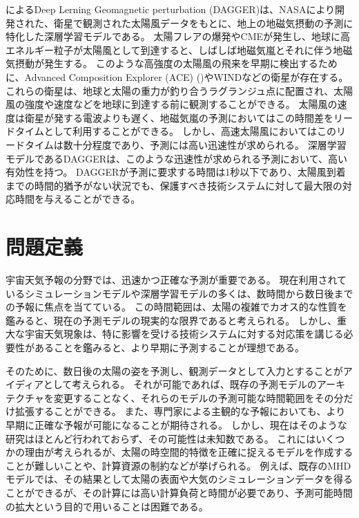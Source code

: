     によるDeep Lerning Geomagnetic perturbation (DAGGER)は、NASAにより開発された、衛星で観測された太陽風データをもとに、地上の地磁気摂動の予測に特化した深層学習モデルである。
    太陽フレアの爆発やCMEが発生し、地球に高エネルギー粒子が太陽風として到達すると、しばしば地磁気嵐とそれに伴う地磁気摂動が発生する。
    このような高強度の太陽風の飛来を早期に検出するために、Advanced Composition Explorer (ACE) ()やWINDなどの衛星が存在する。
    これらの衛星は、地球と太陽の重力が釣り合うラグランジュ点に配置され、太陽風の強度や速度などを地球に到達する前に観測することができる。
    太陽風の速度は衛星が発する電波よりも遅く、地磁気嵐の予測においてはこの時間差をリードタイムとして利用することができる。
    しかし、高速太陽風においてはこのリードタイムは数十分程度であり、予測には高い迅速性が求められる。
    深層学習モデルであるDAGGERは、このような迅速性が求められる予測において、高い有効性を持つ。
    DAGGERが予測に要求する時間は1秒以下であり、太陽風到着までの時間的猶予がない状況でも、保護すべき技術システムに対して最大限の対応時間を与えることができる。
    

\section{問題定義}
宇宙天気予報の分野では、迅速かつ正確な予測が重要である。
現在利用されているシミュレーションモデルや深層学習モデルの多くは、数時間から数日後までの予報に焦点を当てている。
この時間範囲は、太陽の複雑でカオス的な性質を鑑みると、現在の予測モデルの現実的な限界であると考えられる。
しかし、重大な宇宙天気現象は、特に影響を受ける技術システムに対する対応策を講じる必要性があることを鑑みると、より早期に予測することが理想である。

そのために、数日後の太陽の姿を予測し、観測データとして入力とすることがアイディアとして考えられる。
それが可能であれば、既存の予測モデルのアーキテクチャを変更することなく、それらのモデルの予測可能な時間範囲をその分だけ拡張することができる。
また、専門家による主観的な予報においても、より早期に正確な予報が可能になることが期待される。
しかし、現在はそのような研究はほとんど行われておらず、その可能性は未知数である。
これにはいくつかの理由が考えられるが、太陽の時空間的特徴を正確に捉えるモデルを作成することが難しいことや、計算資源の制約などが挙げられる。
例えば、既存のMHDモデルでは、その結果として太陽の表面や大気のシミュレーションデータを得ることができるが、その計算には高い計算負荷と時間が必要であり、予測可能時間の拡大という目的で用いることは困難である。

